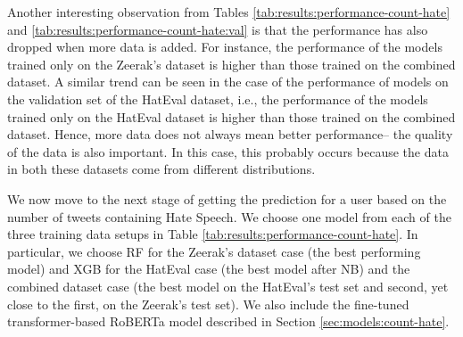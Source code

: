 Another interesting observation from Tables \ref{tab:results:performance-count-hate} and \ref{tab:results:performance-count-hate:val} is that the performance has also dropped when more data is added. For instance, the performance of the models trained only on the Zeerak's dataset is higher than those trained on the combined dataset. A similar trend can be seen in the case of the performance of models on the validation set of the HatEval dataset, i.e., the performance of the models trained only on the HatEval dataset is higher than those trained on the combined dataset. Hence, more data does not always mean better performance-- the quality of the data is also important. In this case, this probably occurs because the data in both these datasets come from different distributions. 



We now move to the next stage of getting the prediction for a user based on the number of tweets containing Hate Speech. We choose one model from each of the three training data setups in Table \ref{tab:results:performance-count-hate}. In particular, we choose \ac{RF} for the Zeerak's dataset case (the best performing model) and \ac{XGB} for the HatEval case (the best model after \ac{NB}) and the combined dataset case (the best model on the HatEval's test set and second, yet close to the first, on the Zeerak's test set). We also include the fine-tuned transformer-based \ac{RoBERTa} model described in Section \ref{sec:models:count-hate}.

